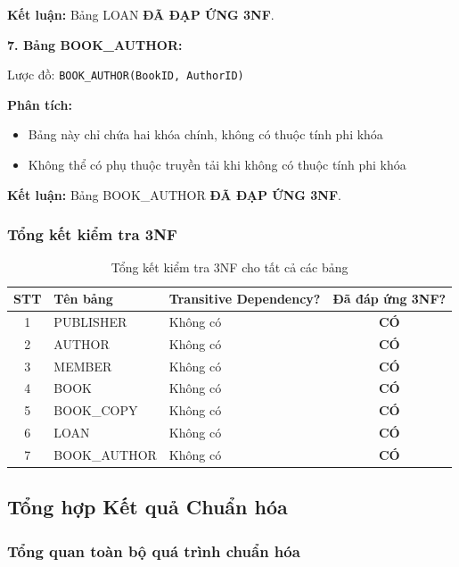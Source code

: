 \documentclass[12pt,a4paper]{article}
\begin{document}
\textbf{Kết luận:} Bảng LOAN \textbf{ĐÃ ĐẠP ỨNG 3NF}.

\vspace{0.3cm}

\textbf{7. Bảng BOOK\_AUTHOR:}

Lược đồ: \texttt{BOOK\_AUTHOR(BookID, AuthorID)}

\textbf{Phân tích:}
\begin{itemize}
    \item Bảng này chỉ chứa hai khóa chính, không có thuộc tính phi khóa
    \item Không thể có phụ thuộc truyền tải khi không có thuộc tính phi khóa
\end{itemize}

\textbf{Kết luận:} Bảng BOOK\_AUTHOR \textbf{ĐÃ ĐẠP ỨNG 3NF}.

\subsubsection{Tổng kết kiểm tra 3NF}

\begin{table}[H]
\centering
\caption{Tổng kết kiểm tra 3NF cho tất cả các bảng}
\begin{tabular}{|c|l|l|c|}
\hline
\textbf{STT} & \textbf{Tên bảng} & \textbf{Transitive Dependency?} & \textbf{Đã đáp ứng 3NF?} \\ \hline
1 & PUBLISHER & Không có & \textbf{CÓ} \\ \hline
2 & AUTHOR & Không có & \textbf{CÓ} \\ \hline
3 & MEMBER & Không có & \textbf{CÓ} \\ \hline
4 & BOOK & Không có & \textbf{CÓ} \\ \hline
5 & BOOK\_COPY & Không có & \textbf{CÓ} \\ \hline
6 & LOAN & Không có & \textbf{CÓ} \\ \hline
7 & BOOK\_AUTHOR & Không có & \textbf{CÓ} \\ \hline
\end{tabular}
\end{table}

\subsection{Tổng hợp Kết quả Chuẩn hóa}

\subsubsection{Tổng quan toàn bộ quá trình chuẩn hóa}
\end{document}
